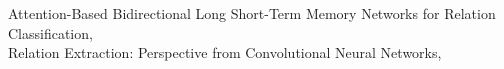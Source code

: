 \documentclass[11pt]{article}
\begin{document}

\begin{thebibliography}{9}
	Attention-Based Bidirectional Long Short-Term Memory Networks for
	Relation Classification,
	\\\texttt{}
	Relation Extraction: Perspective from Convolutional Neural Networks,
	\\\texttt{}
\end{thebibliography}
	
\end{document}
